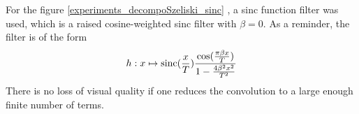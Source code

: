 	For the figure \ref{experiments_decompoSzeliski_sinc} , a sinc function filter was used, which is a raised cosine-weighted sinc filter with $\beta = 0$. As a reminder, the filter is of the form
		\[h : x \mapsto \operatorname{sinc}(\frac{x}{T})\frac{\cos(\frac{\pi\beta x}{T})}{1-\frac{4\beta^2x^2}{T^2}}\]
		There is no loss of visual quality if one reduces the convolution to a large enough finite number of terms.
		
	
